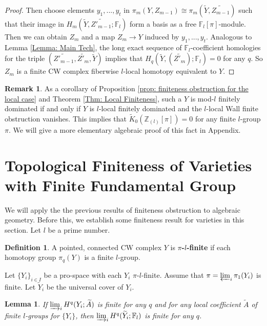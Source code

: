 \documentclass[11pt]{amsart}
\newtheorem{lemma}[theorem]{Lemma}
\theoremstyle{definition}
\newtheorem{definition}[theorem]{Definition}
\newtheorem{remark}[theorem]{Remark}
\numberwithin{equation}{section}
\numberwithin{equation}{section}
\newcommand\ZZ{\mathbb{Z}}
\newcommand\FF{\mathbb{F}}
\begin{document}
\begin{proof}
Then choose elements $y_1,...,y_t$ in $\pi_m(Y,Z_{m-1})\cong \pi_m(\widetilde{Y},\widetilde{Z_{m-1}})$ such that their image in $H_m(\widetilde{Y},\widetilde{Z'_{m-1}};\FF_l)$ form a basis as a free $\FF_l[\pi]$-module. Then we can obtain $Z_m$ and a map $Z_m\rightarrow Y$ induced by $y_1,...,y_t$. Analogous to Lemma \ref{Lemma: Main Tech}, the long exact sequence of $\FF_l$-coefficient homologies for the triple $(\widetilde{Z'_{m-1}},\widetilde{Z'_m},\widetilde{Y})$ implies that $H_q(\widetilde{Y},(\widetilde{Z'_m});\FF_l)=0$ for any $q$. So $Z_m$ is a finite CW complex fiberwise $l$-local homotopy equivalent to $Y$.
\end{proof}

\begin{remark}\label{Rem: vanishing of k-group}
As a corollary of Proposition \ref{prop: finiteness obstruction for the local case} and Theorem \ref{Thm: Local Finiteness}, such a $Y$ is mod-$l$ finitely dominated if and only if $Y$ is $l$-local finitely dominated and the $l$-local Wall finite obstruction vanishes. This implies that $\widetilde{K}_0(\ZZ_{(l)}[\pi])=0$ for any finite $l$-group $\pi$. We will give a more elementary algebraic proof of this fact in Appendix.
\end{remark}

\section{Topological Finiteness of Varieties with Finite Fundamental Group}

We will apply the the previous results of finiteness obstruction to algebraic geometry. Before this, we establish some finiteness result for varieties in this section. Let $l$ be a prime number. 

\begin{definition}
A pointed, connected CW complex $Y$ is \textbf{$\pi$-$l$-finite} if each homotopy group $\pi_q(Y)$ is a finite $l$-group.    
\end{definition}

Let $\{Y_i\}_{i\in I}$ be a pro-space with each $Y_i$ $\pi$-$l$-finite. Assume that $\pi=\varprojlim_i \pi_1(Y_i)$ is finite. Let $\widetilde{Y}_i$ be the universal cover of $Y_i$.

\begin{lemma}\label{Lem: Univerisal Cover Cohomology}
If $\varinjlim_i H^q(Y_i;\widetilde{A})$ is finite for any $q$ and for any local coefficient $\widetilde{A}$ of finite $l$-groups for $\{Y_i\}$, then $\varinjlim_i H^q(\widetilde{Y}_i;\FF_l)$ is finite for any $q$.
\end{lemma}
\end{document}

